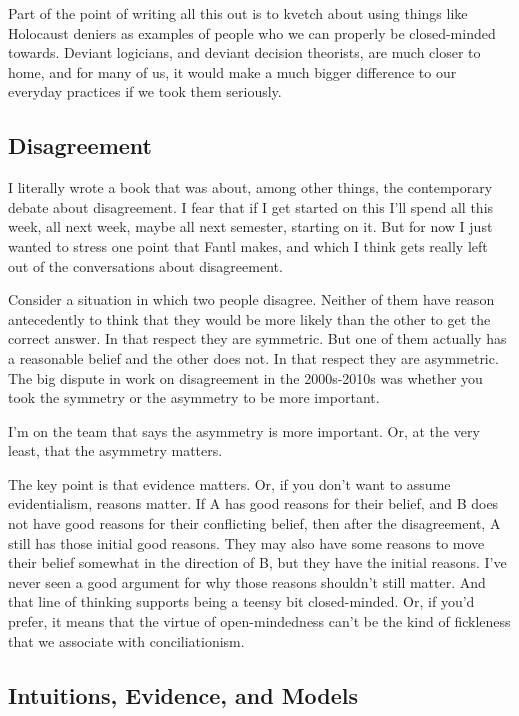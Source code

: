 \documentclass[
]{article}
\begin{document}
Part of the point of writing all this out is to kvetch about using
things like Holocaust deniers as examples of people who we can properly
be closed-minded towards. Deviant logicians, and deviant decision
theorists, are much closer to home, and for many of us, it would make a
much bigger difference to our everyday practices if we took them
seriously.

\hypertarget{disagreement}{%
\subsection{Disagreement}\label{disagreement}}

I literally wrote a book that was about, among other things, the
contemporary debate about disagreement. I fear that if I get started on
this I'll spend all this week, all next week, maybe all next semester,
starting on it. But for now I just wanted to stress one point that Fantl
makes, and which I think gets really left out of the conversations about
disagreement.

Consider a situation in which two people disagree. Neither of them have
reason antecedently to think that they would be more likely than the
other to get the correct answer. In that respect they are symmetric. But
one of them actually has a reasonable belief and the other does not. In
that respect they are asymmetric. The big dispute in work on
disagreement in the 2000s-2010s was whether you took the symmetry or the
asymmetry to be more important.

I'm on the team that says the asymmetry is more important. Or, at the
very least, that the asymmetry matters.

The key point is that evidence matters. Or, if you don't want to assume
evidentialism, reasons matter. If A has good reasons for their belief,
and B does not have good reasons for their conflicting belief, then
after the disagreement, A still has those initial good reasons. They may
also have some reasons to move their belief somewhat in the direction of
B, but they have the initial reasons. I've never seen a good argument
for why those reasons shouldn't still matter. And that line of thinking
supports being a teensy bit closed-minded. Or, if you'd prefer, it means
that the virtue of open-mindedness can't be the kind of fickleness that
we associate with conciliationism.

\hypertarget{intuitions-evidence-and-models}{%
\subsection{Intuitions, Evidence, and
Models}\label{intuitions-evidence-and-models}}
\end{document}
